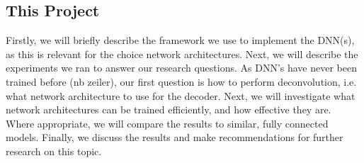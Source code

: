 \subsection{This Project}
Firstly, we will briefly describe the framework we use to implement the DNN(s), as this is relevant for the choice network architectures. Next, we will describe the experiments we ran to answer our research questions. As DNN's have never been trained before (nb zeiler), our first question is how to perform deconvolution, i.e. what network architecture to use for the decoder. Next, we will investigate what network architectures can be trained efficiently, and how effective they are. Where appropriate, we will compare the results to similar, fully connected models. Finally, we discuss the results and make recommendations for further research on this topic.
\newpage



